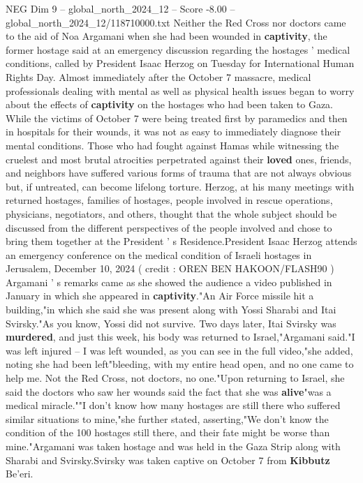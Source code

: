 \begin{textsample}{NEG Dim 9 – global\_north\_2024\_12 – Score -8.00 – global\_north\_2024\_12/118710000.txt}  \label{ex:f9_neg_118}
Neither the Red Cross nor doctors came to the aid of Noa Argamani when she had been wounded in \textbf{captivity}, the former hostage said at an emergency discussion regarding the hostages ' medical conditions, called by President Isaac Herzog on Tuesday for International Human Rights Day.
Almost immediately after the October 7 massacre, medical professionals dealing with mental as well as physical health issues began to worry about the effects of \textbf{captivity} on the hostages who had been taken to Gaza.
While the victims of October 7 were being treated first by paramedics and then in hospitals for their wounds, it was not as easy to immediately diagnose their mental conditions.
Those who had fought against Hamas while witnessing the cruelest and most brutal atrocities perpetrated against their \textbf{loved} ones, friends, and neighbors have suffered various forms of trauma that are not always obvious but, if untreated, can become lifelong torture.
Herzog, at his many meetings with returned hostages, families of hostages, people involved in rescue operations, physicians, negotiators, and others, thought that the whole subject should be discussed from the different perspectives of the people involved and chose to bring them together at the President ' s Residence.President Isaac Herzog attends an emergency conference on the medical condition of Israeli hostages in Jerusalem, December 10, 2024 ( credit : OREN BEN HAKOON/FLASH90 ) Argamani ' s remarks came as she showed the audience a video published in January in which she appeared in \textbf{captivity}."An Air Force missile hit a building,"in which she said she was present along with Yossi Sharabi and Itai Svirsky."As you know, Yossi did not survive.
Two days later, Itai Svirsky was \textbf{murdered}, and just this week, his body was returned to Israel,"Argamani said."I was left injured -- I was left wounded, as you can see in the full video,"she added, noting she had been left"bleeding, with my entire head open, and no one came to help me.
Not the Red Cross, not doctors, no one."Upon returning to Israel, she said the doctors who saw her wounds said the fact that she was \textbf{alive}"was a medical miracle.""I don't know how many hostages are still there who suffered similar situations to mine,"she further stated, asserting,"We don't know the condition of the 100 hostages still there, and their fate might be worse than mine."Argamani was taken hostage and was held in the Gaza Strip along with Sharabi and Svirsky.Svirsky was taken captive on October 7 from \textbf{Kibbutz} Be'eri.

\end{textsample}
